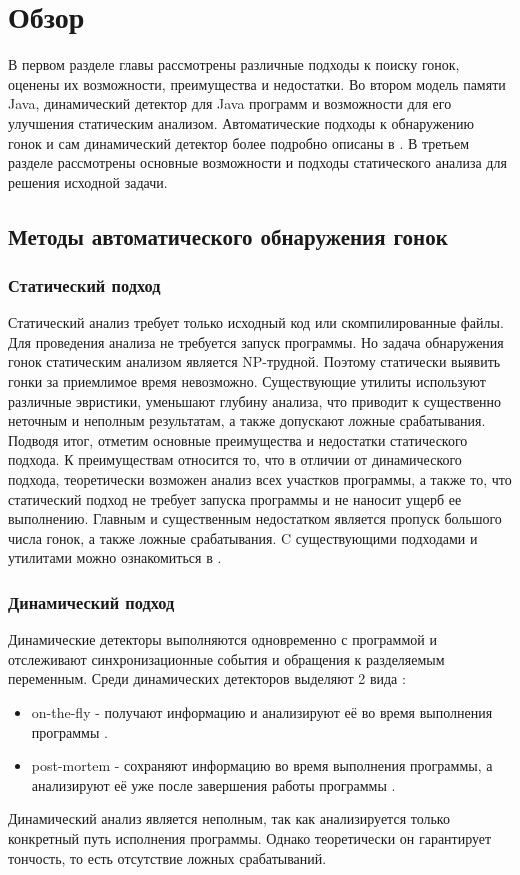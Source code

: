 \chapter{Обзор}
\label{chapSVD}

В первом разделе главы рассмотрены различные подходы к поиску гонок, оценены их возможности, преимущества и недостатки. 
Во втором модель памяти Java, динамический детектор для Java программ и возможности для его улучшения статическим анализом.
Автоматические подходы к обнаружению гонок и сам динамический детектор более подробно описаны в \cite{DRD}.
В третьем разделе рассмотрены основные возможности и подходы статического анализа для решения исходной задачи.


\FloatBarrier
\section{Методы автоматического обнаружения гонок}
\subsection{Статический подход}
Статический анализ требует только исходный код или скомпилированные файлы. Для проведения анализа не требуется запуск программы. Но задача обнаружения гонок статическим анализом является NP-трудной. Поэтому статически выявить гонки за приемлимое время невозможно. Существующие утилиты используют различные эвристики, уменьшают глубину анализа, что приводит к существенно неточным и неполным результатам, а также допускают ложные срабатывания.
Подводя итог, отметим основные преимущества и недостатки статического подхода. К преимуществам относится то, что в отличии от динамического подхода, теоретически возможен анализ всех участков программы, а также то, что статический подход не требует запуска программы и не наносит ущерб ее выполнению. Главным и существенным недостатком является
пропуск большого числа гонок, а также ложные срабатывания. C существующими подходами и утилитами можно ознакомиться в \cite{Static} \cite{RacerX}.


\subsection{Динамический подход}
Динамические детекторы выполняются одновременно с программой и отслеживают синхронизационные события и обращения к разделяемым переменным. Среди динамических детекторов выделяют 2 вида : 
\begin{itemize}
\item on-the-fly - получают информацию и анализируют её во время выполнения программы \cite{OnTheFly}.
\item post-mortem - сохраняют информацию во время выполнения программы, а анализируют её уже
после завершения работы программы \cite{PostMortem}.
\end{itemize}
Динамический анализ является неполным, так как анализируется только конкретный путь исполнения программы. Однако теоретически он гарантирует тончость, то есть отсутствие ложных срабатываний. 

